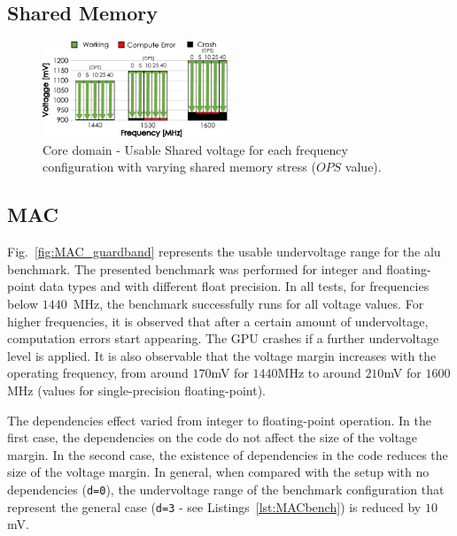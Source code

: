 \subsection{Shared Memory}

\begin{figure}[htb]
  \centering
  \includegraphics[width=0.5\textwidth]{Figures/GPU_characterization/SharedMemory_guardband.pdf}
  \caption{Core domain - Usable Shared voltage for each frequency configuration with varying shared memory stress ($OPS$ value).}
  \label{fig:CacheL2_guardband}
\end{figure}

\subsection{MAC}

Fig.~\ref{fig:MAC_guardband} represents the usable undervoltage range for the \acrshort{alu} benchmark. The presented benchmark was performed for integer and floating-point data types and with different float precision. In all tests, for frequencies below $1440$~MHz, the benchmark successfully runs for all voltage values. For higher frequencies, it is observed that after a certain amount of undervoltage, computation errors start appearing. The GPU crashes if a further undervoltage level is applied. 
It is also observable that the voltage margin increases with the operating frequency, from around $170$mV for $1440$MHz to around $210$mV for $1600$MHz (values for single-precision floating-point).

The dependencies effect varied from integer to floating-point operation. In the first case, the dependencies on the code do not affect the size of the voltage margin. In the second case, the existence of dependencies in the code reduces the size of the voltage margin. In general, when compared with the setup with no dependencies (\texttt{d=0}), the undervoltage range of the benchmark configuration that represent the general case (\texttt{d=3} - see Listings~\ref{lst:MACbench}) is reduced by $10$mV. 

